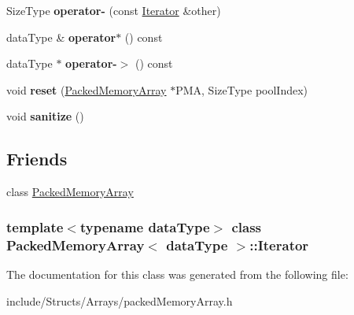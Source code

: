 \begin{DoxyCompactItemize}
\item 
\hypertarget{class_packed_memory_array_1_1_iterator_aac874547081c3a65326273d1c7ee862d}{
SizeType {\bfseries operator-\/} (const \hyperlink{class_packed_memory_array_1_1_iterator}{Iterator} \&other)}
\label{class_packed_memory_array_1_1_iterator_aac874547081c3a65326273d1c7ee862d}

\item 
\hypertarget{class_packed_memory_array_1_1_iterator_a96bb317d4bc4e5e58abf5cc2a8717c5a}{
dataType \& {\bfseries operator$\ast$} () const }
\label{class_packed_memory_array_1_1_iterator_a96bb317d4bc4e5e58abf5cc2a8717c5a}

\item 
\hypertarget{class_packed_memory_array_1_1_iterator_ada05ed8e20179e008c223f0b68c15e2d}{
dataType $\ast$ {\bfseries operator-\/$>$} () const }
\label{class_packed_memory_array_1_1_iterator_ada05ed8e20179e008c223f0b68c15e2d}

\item 
\hypertarget{class_packed_memory_array_1_1_iterator_aad5bde5eebabed6a01d371bea8b0bcfa}{
void {\bfseries reset} (\hyperlink{class_packed_memory_array}{PackedMemoryArray} $\ast$PMA, SizeType poolIndex)}
\label{class_packed_memory_array_1_1_iterator_aad5bde5eebabed6a01d371bea8b0bcfa}

\item 
\hypertarget{class_packed_memory_array_1_1_iterator_a2675ba2356e1b68f322735716a7f6de8}{
void {\bfseries sanitize} ()}
\label{class_packed_memory_array_1_1_iterator_a2675ba2356e1b68f322735716a7f6de8}

\end{DoxyCompactItemize}
\subsection*{Friends}
\begin{DoxyCompactItemize}
\item 
\hypertarget{class_packed_memory_array_1_1_iterator_a550eaf33f7dbe24ec41a1c540edd59ca}{
class \hyperlink{class_packed_memory_array_1_1_iterator_a550eaf33f7dbe24ec41a1c540edd59ca}{PackedMemoryArray}}
\label{class_packed_memory_array_1_1_iterator_a550eaf33f7dbe24ec41a1c540edd59ca}

\end{DoxyCompactItemize}
\subsubsection*{template$<$typename dataType$>$ class PackedMemoryArray$<$ dataType $>$::Iterator}



The documentation for this class was generated from the following file:\begin{DoxyCompactItemize}
\item 
include/Structs/Arrays/packedMemoryArray.h\end{DoxyCompactItemize}
